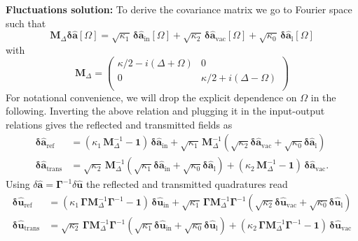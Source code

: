 \noindent \textbf{Fluctuations solution: }To derive the covariance matrix we go to Fourier space such that 
\begin{equation}
     \mathbf{M}_\Delta \mathbf{\delta \hat{a}}[\Omega]  = \sqrt{\kappa_{\mathrm{1}}} \, \mathbf{\delta \hat{a}_{\mathrm{in}}}[\Omega]  + \sqrt{\kappa_2} \, \mathbf{\delta \hat{a}_{\mathrm{vac}}}[\Omega]   + \sqrt{\kappa_0} \, \mathbf{\delta \hat{a}_{\mathrm{l}}}[\Omega]   
\end{equation}
with 
\begin{equation*}
  \mathbf{M}_\Delta =\begin{pmatrix}
  \kappa/2-i(\Delta+\Omega) & 0 \\ 
  0 & \kappa/2+i(\Delta-\Omega)\\ 
  \end{pmatrix} 
\end{equation*}
For notational convenience, we will drop the explicit dependence on $\Omega$ in the following. Inverting the above relation and plugging it in the input-output relations gives the reflected and transmitted fields as
\begin{equation}
  \begin{split}
  \mathbf{\delta \hat{a}_{\mathrm{ref}}}  &= ( \kappa_1 \, \mathbf{M}^{-1}_\Delta - \mathbf{1} )\, \mathbf{\delta \hat{a}_{\mathrm{in}}} +  \sqrt{\kappa_1} \,\mathbf{M}^{-1}_\Delta (\sqrt{\kappa_2} \mathbf{\delta \hat{a}_{\mathrm{vac}}} + \sqrt{\kappa_0}  \mathbf{\delta \hat{a}_{\mathrm{l}}} ) \\
  \mathbf{\delta \hat{a}_{\mathrm{trans}}} & =  \sqrt{\kappa_2} \,\mathbf{M}^{-1}_\Delta (\sqrt{\kappa_1} \mathbf{\delta \hat{a}_{\mathrm{in}}} + \sqrt{\kappa_0}  \mathbf{\delta \hat{a}_{\mathrm{l}}} ) +  (\kappa_2 \,\mathbf{M}^{-1}_\Delta - \mathbf{1}) \, \mathbf{\delta \hat{a}_{\mathrm{vac}}}. 
  \end{split}
\end{equation}
Using $\delta \hat{\mathbf{a}} = \mathbf \Gamma^{-1} \delta \hat{\mathbf{u}}$ the reflected and transmitted quadratures read
\begin{equation}
  \begin{split}
  \mathbf{\delta \hat{u}_{\mathrm{ref}}} &= ( \kappa_1 \, \mathbf{\Gamma} \mathbf{M}^{-1}_\Delta \mathbf{\Gamma}^{-1}- \mathbf{1} )\, \mathbf{\delta \hat{u}_{\mathrm{in}}} +  \sqrt{\kappa_1} \,\mathbf{\Gamma}  \mathbf{M}^{-1}_\Delta \mathbf{\Gamma}^{-1} (\sqrt{\kappa_2} \mathbf{\delta \hat{u}_{\mathrm{vac}}} + \sqrt{\kappa_0}  \mathbf{\delta \hat{u}_{\mathrm{l}}} ) \\
  \mathbf{\delta \hat{u}_{\mathrm{trans}}} & =  \sqrt{\kappa_2} \,\mathbf{\Gamma}  \mathbf{M}^{-1}_\Delta \mathbf{\Gamma}^{-1} (\sqrt{\kappa_1} \mathbf{\delta \hat{u}_{\mathrm{in}}} + \sqrt{\kappa_0}  \mathbf{\delta \hat{u}_{\mathrm{l}}} ) +  (\kappa_2 \,\mathbf{\Gamma}  \mathbf{M}^{-1}_\Delta \mathbf{\Gamma}^{-1}- \mathbf{1}) \, \mathbf{\delta \hat{u}_{\mathrm{vac}}}
  \end{split}
\label{eq:cavity_quad}
\end{equation}
